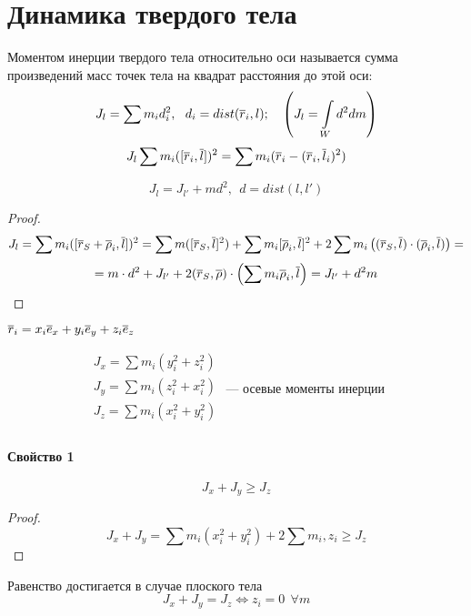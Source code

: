 \section{Динамика твердого тела}
\begin{df}
Моментом инерции твердого тела относительно оси называется сумма произведений масс точек тела на квадрат расстояния до этой оси:
\begin{equation}
	\label{nine.one}
	J_l = \sum m_i d_i^2,~~ d_i = dist({\overline{r}}_i, l);~~~ \left( J_l = \int\limits_W d^2 dm \right)
\end{equation}
\begin{equation}
	\label{nine.two}
	J_l \sum m_i([{\overline{r}}_i, {\overline{l}}])^2 = \sum m_i ({\overline{r}}_i - ({\overline{r}}_i, {\overline{l}}_i)^2)
\end{equation}
\end{df}

\begin{teo}
\[
	J_l = J_{l'} + md^2,~~ d = dist(l, l')
\]
\end{teo}
\begin{proof}
\[
	J_l = \sum m_i ([{\overline{r}}_S + {\overline{\rho}}_i, {\overline{l}}])^2 = \sum m([{\overline{r}}_S, {\overline{l}}]^2) + \sum m_i[{\overline{\rho}}_i, {\overline{l}}]^2 + 2 \sum m_i \left( ({\overline{r}}_S, {\overline{l}}) \cdot ({\overline{\rho}}_i, {\overline{l}}) \right) = 
\]
\[ 
	= m \cdot d^2 + J_{l'} + 2({\overline{r}}_S, {\overline{\rho}}) \cdot \left( \sum m_i {\overline{\rho}}_i, {\overline{l}} \right) = J_{l'} + d^2 m
\]
\end{proof}


\noindent ${\overline{r}}_i = x_i{\overline{e}}_x + y_i {\overline{e}}_y + z_i {\overline{e}}_z$
\begin{df}
\[
\begin{array}{l}
J_x = \sum m_i (y_i^2 + z_i^2) \\
J_y = \sum m_i (z_i^2 + x_i^2) \\
J_z = \sum m_i (x_i^2 + y_i^2) \\
\end{array} \text{ --- осевые моменты инерции}
\]
\end{df}

\paragraph*{Свойство 1} \[
	J_x + J_y \geqslant J_z
\]
\begin{proof}
\[
	J_x + J_y = \sum m_i(x_i^2 + y_i^2) + 2\sum m_i, z_i \geqslant J_z
\]
\end{proof}

\begin{ntc} Равенство достигается в случае плоского тела
\[
	J_x + J_y = J_z \Leftrightarrow z_i = 0~~ \forall m
\]
\end{ntc}

